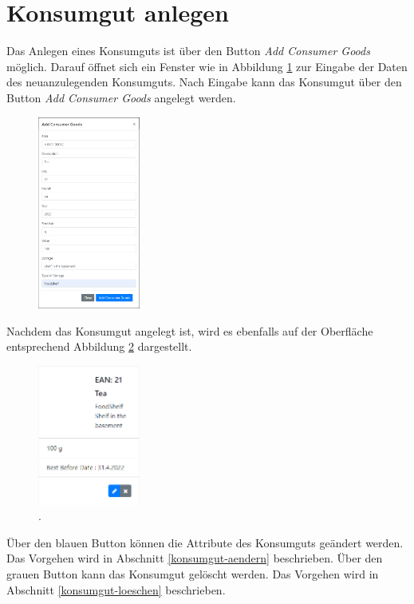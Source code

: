 \section{Konsumgut anlegen}
\label{konsumgut-anlegen}
Das Anlegen eines Konsumguts ist über den Button \textit{Add Consumer Goods} möglich.
Darauf öffnet sich ein Fenster wie in Abbildung \ref{fig:gui-add-consumer} zur Eingabe der Daten des neuanzulegenden Konsumguts.
Nach Eingabe kann das Konsumgut über den Button \textit{Add Consumer Goods} angelegt werden.

\begin{figure}[H]
	\centering
	\includegraphics[width=0.3\textwidth]{Bilder/gui/add-consumer-goods.PNG}
	\caption[.]{}
	\label{fig:gui-add-consumer}
\end{figure}

Nachdem das Konsumgut angelegt ist, wird es ebenfalls auf der Oberfläche entsprechend Abbildung \ref{fig:gui-created-item} dargestellt.

\begin{figure}[H]
	\centering
	\includegraphics[width=0.3\textwidth]{Bilder/gui/gui-created-item.PNG}
	\caption[.]{.}
	\label{fig:gui-created-item}
\end{figure}

Über den blauen Button können die Attribute des Konsumguts geändert werden.
Das Vorgehen wird in Abschnitt \ref{konsumgut-aendern} beschrieben.
Über den grauen Button kann das Konsumgut gelöscht werden.
Das Vorgehen wird in Abschnitt \ref{konsumgut-loeschen} beschrieben.

